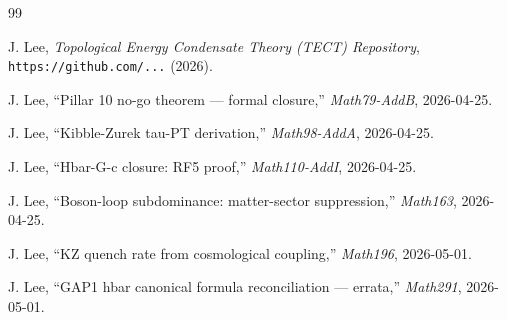 \begin{thebibliography}{99}

J. Lee, \textit{Topological Energy Condensate Theory (TECT) Repository},
\texttt{https://github.com/...} (2026).

J. Lee, ``Pillar 10 no-go theorem — formal closure,''
\textit{Math79-AddB}, 2026-04-25.

J. Lee, ``Kibble-Zurek tau-PT derivation,''
\textit{Math98-AddA}, 2026-04-25.

J. Lee, ``Hbar-G-c closure: RF5 proof,''
\textit{Math110-AddI}, 2026-04-25.

J. Lee, ``Boson-loop subdominance: matter-sector suppression,''
\textit{Math163}, 2026-04-25.

J. Lee, ``KZ quench rate from cosmological coupling,''
\textit{Math196}, 2026-05-01.

J. Lee, ``GAP1 hbar canonical formula reconciliation — errata,''
\textit{Math291}, 2026-05-01.

\end{thebibliography}


